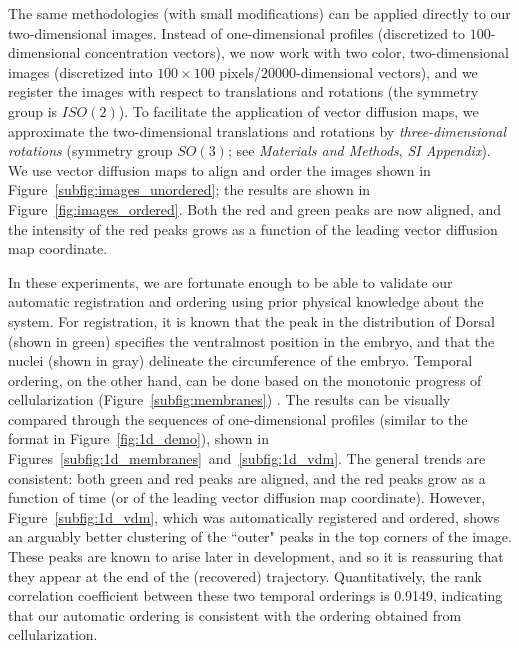 \documentclass{pnastwo}
\begin{document}
\begin{article}
The same methodologies (with small modifications) can be applied directly to our two-dimensional images.
%
Instead of one-dimensional profiles (discretized to $100$-dimensional concentration vectors), we now work with
two color, two-dimensional images (discretized into $100 \times 100$ pixels/$20000$-dimensional vectors), and we register the images with respect to translations and rotations (the symmetry group is $ISO(2)$).
%
To facilitate the application of vector diffusion maps, we approximate the two-dimensional translations and rotations by {\em three-dimensional rotations} (symmetry group $SO(3)$; see {\it Materials and Methods}, {\it SI Appendix}).
%
We use vector diffusion maps to align and order the images shown in Figure~\ref{subfig:images_unordered};
the results are shown in Figure~\ref{fig:images_ordered}.
%
Both the red and green peaks are now aligned, and the intensity of the red peaks grows as a function of the leading vector diffusion map coordinate.

In these experiments, we are fortunate enough to be able to validate our  automatic registration and ordering using prior physical knowledge about the system.
%
For registration, it is known that the peak in the distribution of Dorsal (shown in green) specifies the ventralmost position in the embryo, and that the nuclei (shown in gray) delineate the circumference of the embryo.
%
%
Temporal ordering, on the other hand, can be done based on the monotonic progress of cellularization (Figure~\ref{subfig:membranes}) \cite{figard2013plasma}.%
%
The results can be visually compared through the sequences of one-dimensional profiles (similar to the format in Figure~\ref{fig:1d_demo}), shown in Figures~\ref{subfig:1d_membranes}~and~\ref{subfig:1d_vdm}.
%
The general trends are consistent:
both green  and red peaks are aligned, and the red peaks grow as a function of time (or of the leading vector diffusion map coordinate).
%
However, Figure~\ref{subfig:1d_vdm}, which was automatically registered and ordered, shows an arguably better clustering of the ``outer" peaks in the top corners of the image.
%
%
These peaks are known to arise later in development, and so it is reassuring that they appear at the end of the (recovered) trajectory.
%
%
Quantitatively, the rank correlation coefficient between these two temporal orderings is 0.9149, indicating that our automatic ordering is consistent with the ordering obtained from cellularization.


\end{article}
\end{document}
